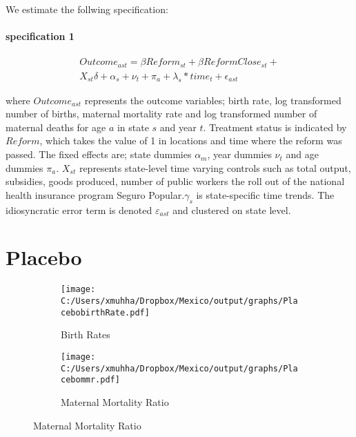 \documentclass[a4paper, 11pt]{article}
\begin{document}
 
 \newpage
 \singlespacing
 
 
 
 \newpage
 \begin{appendices}
  
 	We estimate the follwing specification:
 	\paragraph{specification 1}
 	
 	
 	\begin{eqnarray*}\label{eq1}
 		{Outcome_{ast}= \beta Reform_{st} +\beta ReformClose_{st}+} \\  
 		{	X_{st}\delta +\alpha_{s} + \nu_{t} +\pi_{a}+ \lambda_{s}*time_{t} +\epsilon_{ast}}   
 	\end{eqnarray*}
 	
 	\noindent where $Outcome_{ast}$ represents the outcome variables; birth rate, log transformed number of births, maternal mortality rate and log transformed number of maternal deaths for age $a$ in state $s$ and year $t$. Treatment status is indicated by $Reform$, which takes the value of 1 in locations and time where the reform was passed. The fixed effects are; state dummies $\alpha_{m}$, year dummies  $\nu_{t}$ and age dummies $\pi_{a}$. $X_{st}$ represents state-level time varying controls such as total output, subsidies, goods produced, number of public workers the roll out of the national health insurance program Seguro Popular.$\gamma_{s}$ is state-specific time trends. The idiosyncratic error term is denoted $\varepsilon_{ast}$ and clustered on state  level.  
 \section{Placebo}	
 	
 	  \begin{figure}[htpb!]
 	  	\centering	\caption{Placebo tests}
 	  	\label{reg2}
 	  	\begin{subfigure}{.5\textwidth}
 	  		\centering	\caption{Birth Rates}
 	  		\texttt{[image: C:/Users/xmuhha/Dropbox/Mexico/output/graphs/PlacebobirthRate.pdf]}
 	  		
 	  		\label{placebo_br}
 	  	\end{subfigure}%
 	  	\begin{subfigure}{.5\textwidth}
 	  		\centering	\caption{Maternal Mortality Ratio}
 	  		\texttt{[image: C:/Users/xmuhha/Dropbox/Mexico/output/graphs/Placebommr.pdf]}
 	  		

\end{subfigure}
\end{figure}
\end{appendices}
\end{document}
